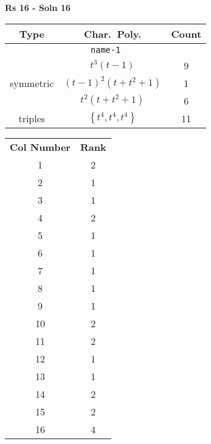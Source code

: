 \documentclass{article}
\begin{document}
    \textbf{Rs 16 - Soln 16}
    \begin{table}
    \begin{tabular}{|c|c|c|}
    \hline
    \textbf{Type} & \textbf{Char.~Poly.} & \textbf{Count} \\
    \hline \multicolumn{3}{|c|}{\texttt{name-1}} \\ \hline
    \multirow{3}{*}{symmetric}
    & $t^3(t - 1)$ & 9 \\
    & $(t - 1)^2(t + t^2 + 1)$ & 1 \\
    & $t^2(t + t^2 + 1)$ & 6 \\
    \hline
    \multirow{1}{*}{triples}
    & $\left\{t^4,t^4,t^4\right\}$ & 11 \\
    \hline
    \end{tabular}
    \end{table}
    \begin{table}
    \begin{tabular}{|c|c|}
    \hline
    \textbf{Col Number} & \textbf{Rank}\\
    1 & 2 \\ 
    2 & 1 \\ 
    3 & 1 \\ 
    4 & 2 \\ 
    5 & 1 \\ 
    6 & 1 \\ 
    7 & 1 \\ 
    8 & 1 \\ 
    9 & 1 \\ 
    10 & 2 \\ 
    11 & 2 \\ 
    12 & 1 \\ 
    13 & 1 \\ 
    14 & 2 \\ 
    15 & 2 \\ 
    16 & 4 \\ 
    \hline
    \end{tabular}
    \end{table}
    \newpage
\end{document}
